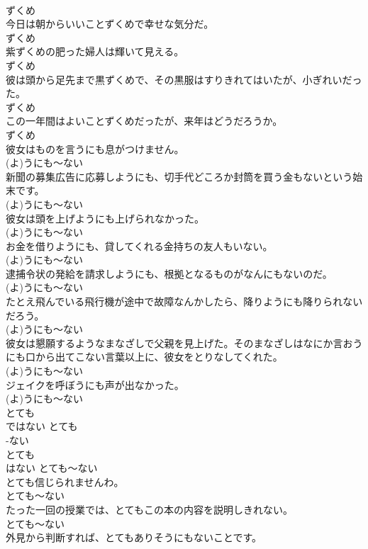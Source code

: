 \documentclass[8pt]{extreport}
\begin{document}
\begin{CJK}{UTF8}{min}
\\	ずくめ
\\	今日は朝からいいことずくめで幸せな気分だ。	
\\	ずくめ
\\	紫ずくめの肥った婦人は輝いて見える。	
\\	ずくめ
\\	彼は頭から足先まで黒ずくめで、その黒服はすりきれてはいたが、小ぎれいだった。	
\\	ずくめ
\\	この一年間はよいことずくめだったが、来年はどうだろうか。	
\\	ずくめ
\\	彼女はものを言うにも息がつけません。	
\\	(よ)うにも～ない
\\	新聞の募集広告に応募しようにも、切手代どころか封筒を買う金もないという始末です。	
\\	(よ)うにも～ない
\\	彼女は頭を上げようにも上げられなかった。	
\\	(よ)うにも～ない
\\	お金を借りようにも、貸してくれる金持ちの友人もいない。	
\\	(よ)うにも～ない
\\	逮捕令状の発給を請求しようにも、根拠となるものがなんにもないのだ。	
\\	(よ)うにも～ない
\\	たとえ飛んでいる飛行機が途中で故障なんかしたら、降りようにも降りられないだろう。	
\\	(よ)うにも～ない
\\	彼女は懇願するようなまなざしで父親を見上げた。そのまなざしはなにか言おうにも口から出てこない言葉以上に、彼女をとりなしてくれた。	
\\	(よ)うにも～ない
\\	ジェイクを呼ぼうにも声が出なかった。	
\\	(よ)うにも～ない
\\	とても 
\\	ではない	とても 
\\	-ない
\\	とても 
\\	はない	とても～ない
\\	とても信じられませんわ。	
\\	とても～ない
\\	たった一回の授業では、とてもこの本の内容を説明しきれない。	
\\	とても～ない
\\	外見から判断すれば、とてもありそうにもないことです。	

\end{CJK}
\end{document}
